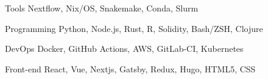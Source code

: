 
\begin{cvskills}

	\cvskill
	{Tools} %
	{Nextflow, Nix/OS, Snakemake, Conda, Slurm} %

	\cvskill
	{Programming} %
	{Python, Node.js, Rust, R, Solidity, Bash/ZSH, Clojure} %

	\cvskill
	{DevOps} %
	{Docker, GitHub Actions, AWS, GitLab-CI, Kubernetes} %

	\cvskill
	{Front-end} %
	{React, Vue, Nextjs, Gatsby, Redux, Hugo, HTML5, CSS} %

	\cvskill


\end{cvskills}

